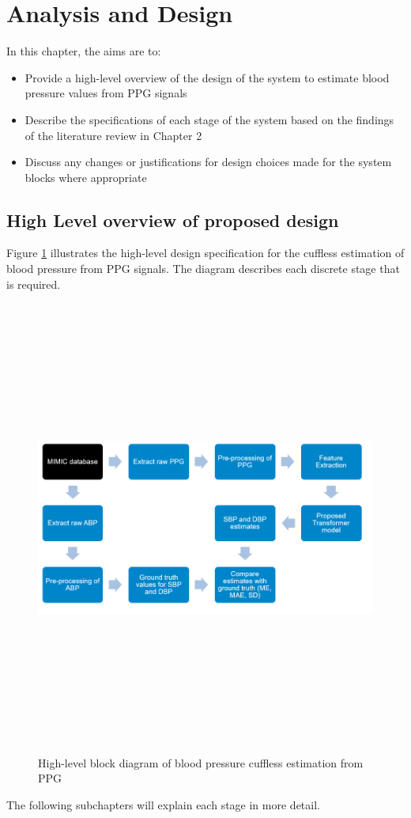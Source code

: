 \section{Analysis and Design}

In this chapter, the aims are to:

\begin{itemize}
    \item Provide a high-level overview of the design of the system to estimate blood pressure values from PPG signals
    \item Describe the specifications of each stage of the system based on the findings of the literature review in Chapter 2
    \item Discuss any changes or justifications for design choices made for the system blocks where appropriate
\end{itemize}

\subsection{High Level overview of proposed design}
Figure \ref{blockdiag} illustrates the high-level design specification for the 
cuffless estimation of blood pressure from PPG signals. The diagram describes 
each discrete stage that is required. 

\begin{figure}[H]
    \centering
    \includegraphics[width=15cm,height=15cm,keepaspectratio]{AnalysisDesign/blockDiag.png}
    \caption{High-level block diagram of blood pressure cuffless estimation from PPG}
    \label{blockdiag}
\end{figure}\noindent The following subchapters will explain each stage in more detail.

